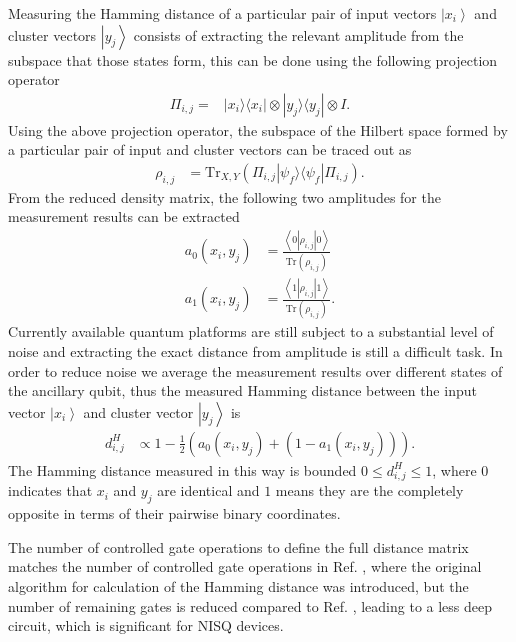 \documentclass[pra,showkeys,twocolumn,showpacs]{revtex4-1}
\begin{document}
Measuring the Hamming distance of a particular pair of input vectors $\left| x_i \right\rangle$ and cluster vectors $\left| y_j \right\rangle$ consists of extracting the relevant amplitude from the subspace that those states form,
this can be done using the following projection operator
%
\begin{align}
\Pi_{i,j} = &\left| x_i \rangle\langle x_i \right| \otimes \left| y_j \rangle\langle y_j \right| \otimes I .
\end{align}
%
Using the above projection operator, the subspace of the Hilbert space formed by a particular pair of input and cluster vectors can be traced out as
%
\begin{align}
    \rho_{i,j} &= \text{Tr}_{X,Y} (\Pi_{i,j} \left| \psi_f \rangle\langle \psi_f \right| \Pi_{i,j}) .
\end{align}
%
From the reduced density matrix, the following two amplitudes for the measurement results can be extracted
%
\begin{align}
    a_0(x_i,y_j) & = \frac{\left\langle 0 |\rho_{i,j}| 0 \right\rangle}{\text{Tr}(\rho_{i,j})}  \\
    a_1(x_i,y_j) & = \frac{\left\langle 1 |\rho_{i,j}| 1 \right\rangle}{\text{Tr}(\rho_{i,j})} .
\end{align}
%
Currently available quantum platforms are still subject to a substantial level of noise and extracting the exact distance from amplitude is still a difficult task. In order to reduce noise we average the measurement results over different states of the ancillary qubit, thus the measured Hamming distance between the input vector $\left| x_i \right\rangle$ and cluster vector $\left| y_j \right\rangle$ is
%
\begin{align}
    d_{i,j}^H & \propto 1 - \frac{1}{2}(a_0(x_i,y_j) + (1-a_1(x_i,y_j))) .
\end{align}
%
The Hamming distance measured in this way is bounded $0 \leq d_{i,j}^H \leq 1$,
where  $0$ indicates that $x_i$ and $y_j$ are identical and $1$ means they are the completely opposite in terms of their pairwise binary coordinates.

The number of controlled gate operations to define the full distance matrix matches the number of controlled gate operations in Ref. \cite{trugenberger2001}, where the original algorithm for calculation of the Hamming distance was introduced, but the number of remaining gates is reduced compared to Ref. \cite{trugenberger2001}, leading to a less deep circuit, which is significant for NISQ devices.
\end{document}
